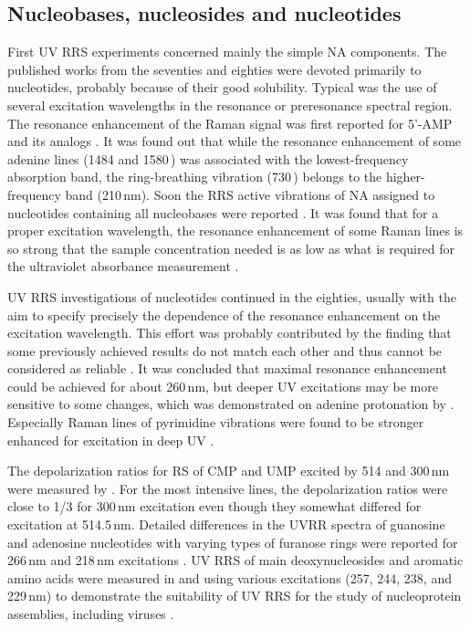 \subsection{Nucleobases, nucleosides and nucleotides}

First UV RRS experiments concerned mainly the simple NA components.
The published works from the seventies and eighties were devoted primarily to
nucleotides, probably because of their good solubility.
Typical was the use of several excitation wavelengths in the resonance or
preresonance spectral region.
The resonance enhancement of the Raman signal was first reported for 5'-AMP and
its analogs
\parencite{%
	Tsuboi1974,%
	Pezolet1975,%
	Blazej1977%
}.
It was found out that while the resonance enhancement of some adenine lines
(1484 and 1580\,\icm{}) was associated with the lowest-frequency absorption
band, the ring-breathing vibration (730\,\icm{}) belongs to the
higher-frequency band (210\,nm).
Soon the RRS active vibrations of NA assigned to nucleotides containing all
nucleobases were reported
\parencite{%
	Chinsky1978,%
	Nishimura1977%
}.
It was found that for a proper excitation wavelength, the resonance
enhancement of some Raman lines is so strong that the sample concentration
needed is as low as what is required for the ultraviolet absorbance measurement
\parencite{Nishimura1977}.

UV RRS investigations of nucleotides continued in the eighties, usually with
the aim to specify precisely the dependence of the resonance enhancement on the
excitation wavelength.
This effort was probably contributed by the finding that some previously
achieved results do not match each other and thus cannot be considered as
reliable
\parencite{Bushaw1980}.
It was concluded that maximal resonance enhancement could be achieved for about
260\,nm, but deeper UV excitations may be more sensitive to some changes,
which was demonstrated on adenine protonation by
\textcite{Kubasek1985}.
Especially Raman lines of pyrimidine vibrations were found to be stronger
enhanced for excitation in deep UV
\parencite{%
	Ziegler1984,%
	Fodor1985%
}.

The depolarization ratios for RS of CMP and UMP excited by 514 and 300\,nm were
measured by
\textcite{Blazej1980}.
For the most intensive lines, the depolarization ratios were close to 1/3 for
300\,nm excitation even though they somewhat differed for excitation at
514.5\,nm.
Detailed differences in the UVRR spectra of guanosine and adenosine nucleotides
with varying types of furanose rings were reported for 266\,nm and 218\,nm
excitations
\parencite{Nishimura1987}.
UV RRS of main deoxynucleosides and aromatic amino acids were measured in
 and  using various excitations (257, 244, 238, and 229\,nm) to
demonstrate the suitability of UV RRS for the study of nucleoprotein
assemblies, including viruses
\parencite{Wen1998}.

